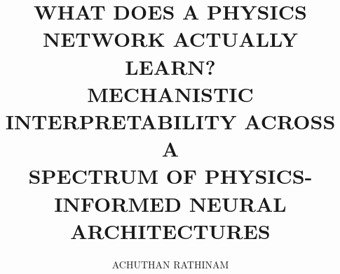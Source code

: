 \documentclass[notes]{buthesis}
\title{WHAT DOES A PHYSICS NETWORK ACTUALLY LEARN?\\
       MECHANISTIC INTERPRETABILITY ACROSS A\\
       SPECTRUM OF PHYSICS-INFORMED NEURAL\\
       ARCHITECTURES}
\author{ACHUTHAN RATHINAM}                            %
\begin{document}
\prelims                                  %
\maketitlepage                            %
\makecopyrightpage                        %
\tableofcontents                          %

\mainbody                                 %











\backmatter





\nocite{*}                                %



\end{document}
